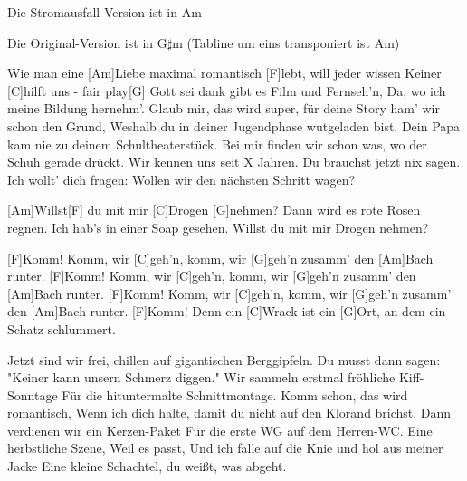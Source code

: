 
Die Stromausfall-Version ist in Am


\noindent Die Original-Version ist in G$\sharp$m (Tabline um eins transponiert ist Am)



\begin{guitar}
	
	Wie man eine [Am]Liebe maximal romantisch [F]lebt, will jeder wissen
	Keiner [C]hilft uns - fair play[G]{ }
	Gott sei dank gibt es Film und Fernseh'n,
	Da, wo ich meine Bildung hernehm'.
	Glaub mir, das wird super, für deine Story ham' wir schon den Grund,
	Weshalb du in deiner Jugendphase wutgeladen bist.
	Dein Papa kam nie zu deinem Schultheaterstück.
	Bei mir finden wir schon was, wo der Schuh gerade drückt.
	Wir kennen uns seit X Jahren.
	Du brauchst jetzt nix sagen.
	Ich wollt' dich fragen:
	Wollen wir den nächsten Schritt wagen?
	
	[Am]Willst[F] du mit mir [C]Drogen [G]nehmen?
	Dann wird es rote Rosen regnen.
	Ich hab’s in einer Soap gesehen.
	Willst du mit mir Drogen nehmen?
	
	[F]Komm! Komm, wir [C]geh'n, komm, wir [G]geh'n zusamm' den [Am]Bach runter.
	[F]Komm! Komm, wir [C]geh'n, komm, wir [G]geh'n zusamm' den [Am]Bach runter.
	[F]Komm! Komm, wir [C]geh'n, komm, wir [G]geh'n zusamm' den [Am]Bach runter.
	[F]Komm! Denn ein [C]Wrack ist ein [G]Ort, an dem ein Schatz schlummert.
	
	\pagebreak
	
	Jetzt sind wir frei, chillen auf gigantischen Berggipfeln.
	Du musst dann sagen: "Keiner kann unsern Schmerz diggen."
	Wir sammeln erstmal fröhliche Kiff-Sonntage
	Für die hituntermalte Schnittmontage.
	Komm schon, das wird romantisch,
	Wenn ich dich halte, damit du nicht auf den Klorand brichst.
	Dann verdienen wir ein Kerzen-Paket
	Für die erste WG auf dem Herren-WC.
	Eine herbstliche Szene,
	Weil es passt,
	Und ich falle auf die Knie und hol aus meiner Jacke
	Eine kleine Schachtel, du weißt, was abgeht.
	
	 
	
	 
	

\end{guitar}

